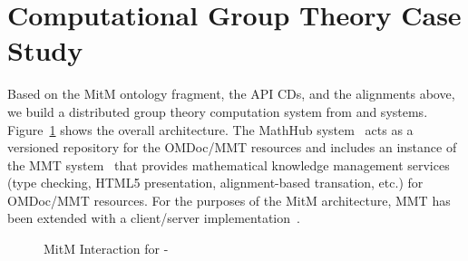 \section{Computational Group Theory Case Study}\label{sec:case}
Based on the MitM ontology fragment, the API CDs, and the alignments above, we build a
distributed group theory computation system from \GAP and \Singular
systems. Figure~\ref{fig:mitmpoc} shows the overall architecture. The MathHub
system~\cite{IanJucKoh:sdm14,MathHub:on} acts as a versioned repository for the OMDoc/MMT
resources and includes an instance of the MMT system~\cite{Rabe:MAGMS13} that provides
mathematical knowledge management services (type checking, HTML5 presentation,
alignment-based transation, etc.) for OMDoc/MMT resources. For the purposes of the MitM
architecture, MMT has been extended with a \SCSCP client/server
implementation~\cite{twiesing:msc17}.

\begin{figure}[ht]\centering
  \caption{MitM Interaction for \GAP-\Singular}\label{fig:mitmpoc}
\end{figure}


